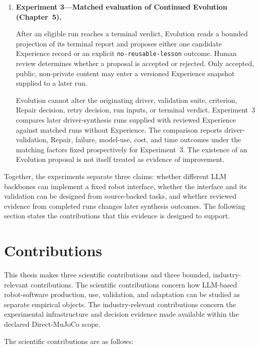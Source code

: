 \begin{enumerate}[leftmargin=*,itemsep=1em]
    \item \textbf{Experiment 3---Matched evaluation of Continued Evolution
    (Chapter~5).}

    After an eligible run reaches a terminal verdict, Evolution reads a bounded
    projection of its terminal report and proposes either one candidate
    Experience record or an explicit \texttt{no-reusable-lesson} outcome. Human
    review determines whether a proposal is accepted or rejected. Only
    accepted, public, non-private content may enter a versioned Experience
    snapshot supplied to a later run.

    Evolution cannot alter the originating driver, validation suite, criterion,
    Repair decision, retry decision, run inputs, or terminal verdict.
    Experiment~3 compares later driver-synthesis runs supplied with reviewed
    Experience against matched runs without Experience. The comparison reports
    driver-validation, Repair, failure, model-use, cost, and time outcomes under
    the matching factors fixed prospectively for Experiment~3. The existence of
    an Evolution proposal is not itself treated as evidence of improvement.
\end{enumerate}

Together, the experiments separate three claims: whether different LLM
backbones can implement a fixed robot interface, whether the interface and its
validation can be designed from source-backed tasks, and whether reviewed
evidence from completed runs changes later synthesis outcomes. The following
section states the contributions that this evidence is designed to support.


\section[Contributions]{Contributions}
\label{sec:intro-contributions}

This thesis makes three scientific contributions and three bounded,
industry-relevant contributions. The scientific contributions concern how
LLM-based robot-software production, use, validation, and adaptation can be
studied as separate empirical objects. The industry-relevant contributions
concern the experimental infrastructure and decision evidence made available
within the declared Direct-MuJoCo scope.

The scientific contributions are as follows:

